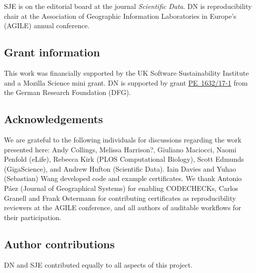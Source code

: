\documentclass[12pt]{article}
\begin{document}
SJE is on the editorial board at the journal \emph{Scientific Data}.
DN is reproducibility chair at the Association of Geographic
Information Laboratories in Europe's (AGILE) annual conference.

\subsection*{Grant information}

This work was financially supported by the UK Software
Sustainability Institute and a Mozilla Science mini grant.
DN is supported by grant
\href{https://gepris.dfg.de/gepris/projekt/415851837}{PE~1632/17-1}
from the German Research Foundation (DFG).

\subsection*{Acknowledgements}\label{acknowledgements}

We are grateful to the following individuals for discussions regarding
the work presented here: Andy Collings, Melissa Harrison?, Giuliano
Maciocci, Naomi Penfold (eLife), Rebecca Kirk (PLOS Computational Biology), Scott
Edmunds (GigaScience), and Andrew Hufton (Scientific Data). Iain Davies and
Yuhao (Sebastian) Wang developed code and example certificates.
We thank Antonio P\'{a}ez (Journal of Geographical Systems) for enabling
CODECHECKs, Carlos Granell and Frank Ostermann for contributing
certificates as reproducibility reviewers at the AGILE conference, and 
all authors of auditable workflows for their participation.

\subsection*{Author contributions}

DN and SJE contributed equally to all aspects of this project.

{\small
}
\end{document}
